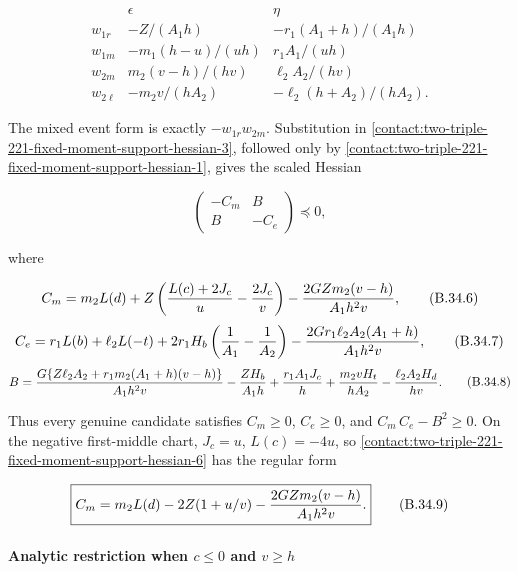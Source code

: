 \[
\begin{array}{c|cc}
 &\epsilon&\eta\\ \hline
 w_{1r}&-Z/(A_1h)&-r_1(A_1+h)/(A_1h)\\
 w_{1m}&-m_1(h-u)/(uh)&r_1A_1/(uh)\\
 w_{2m}&m_2(v-h)/(hv)&\ell_2A_2/(hv)\\
 w_{2\ell}&-m_2v/(hA_2)&-\ell_2(h+A_2)/(hA_2).
\end{array} \tag{B.34.4}\label{contact:two-triple-221-fixed-moment-support-hessian-4}
\]

The mixed event form is exactly $-w_{1r}w_{2m}$. Substitution in \eqref{contact:two-triple-221-fixed-moment-support-hessian-3}, followed
only by \eqref{contact:two-triple-221-fixed-moment-support-hessian-1}, gives the scaled Hessian

\[
 \begin{pmatrix}-C_m&B\\ B&-C_e\end{pmatrix}\preceq0, \tag{B.34.5}\label{contact:two-triple-221-fixed-moment-support-hessian-5}
\]

where

\[
 C_m=m_2L(d)+Z\left({L(c)+2J_c\over u}-{2J_c\over v}\right)
       -{2GZm_2(v-h)\over A_1h^2v}, \tag{B.34.6}\label{contact:two-triple-221-fixed-moment-support-hessian-6}
\]
\[
 C_e=r_1L(b)+\ell_2L(-t)
       +2r_1H_b\left({1\over A_1}-{1\over A_2}\right)
       -{2Gr_1\ell_2A_2(A_1+h)\over A_1h^2v}, \tag{B.34.7}\label{contact:two-triple-221-fixed-moment-support-hessian-7}
\]
\[
 \begin{split}
 B={G\{Z\ell_2A_2+r_1m_2(A_1+h)(v-h)\}\over A_1h^2v}
   -{ZH_b\over A_1h}+{r_1A_1J_c\over h}
   +{m_2vH_t\over hA_2}-{\ell_2A_2H_d\over hv}.
 \end{split} \tag{B.34.8}\label{contact:two-triple-221-fixed-moment-support-hessian-8}
\]

Thus every genuine candidate satisfies $C_m\ge 0$, $C_e\ge 0$, and
$C_m\,C_e-B^2\ge 0$. On the negative first-middle chart, $J_c=u$, $L(c)=-4u$,
so \eqref{contact:two-triple-221-fixed-moment-support-hessian-6} has the regular form

\[
 \boxed{C_m=m_2L(d)-2Z(1+u/v)
                 -{2GZm_2(v-h)\over A_1h^2v}.} \tag{B.34.9}\label{contact:two-triple-221-fixed-moment-support-hessian-9}
\]

\paragraph{Analytic restriction when $c\le 0$ and $v\ge h$}


